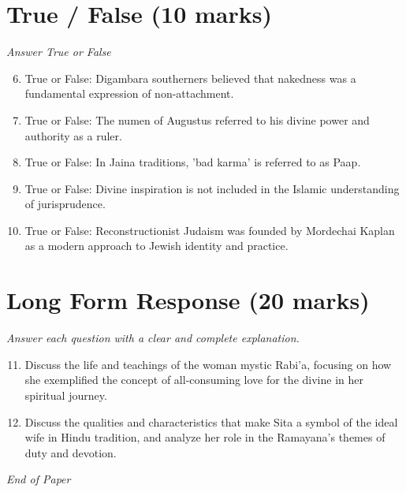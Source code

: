 \documentclass[12pt]{article}
\begin{document}
\section*{True / False (10 marks)}
\textit{Answer True or False}
\begin{enumerate}[label=\arabic*.]
\setcounter{enumi}{5}
\item True or False: Digambara southerners believed that nakedness was a fundamental expression of non-attachment.
\item True or False: The numen of Augustus referred to his divine power and authority as a ruler.
\item True or False: In Jaina traditions, 'bad karma' is referred to as Paap.
\item True or False: Divine inspiration is not included in the Islamic understanding of jurisprudence.
\item True or False: Reconstructionist Judaism was founded by Mordechai Kaplan as a modern approach to Jewish identity and practice.
\end{enumerate}

\section*{Long Form Response (20 marks)}
\textit{Answer each question with a clear and complete explanation.}
\begin{enumerate}[label=\arabic*.]
\setcounter{enumi}{10}
\item Discuss the life and teachings of the woman mystic Rabi'a, focusing on how she exemplified the concept of all-consuming love for the divine in her spiritual journey.
\item Discuss the qualities and characteristics that make Sita a symbol of the ideal wife in Hindu tradition, and analyze her role in the Ramayana's themes of duty and devotion.
\end{enumerate}

\vfill
\noindent\textit{End of Paper}
\end{document}
